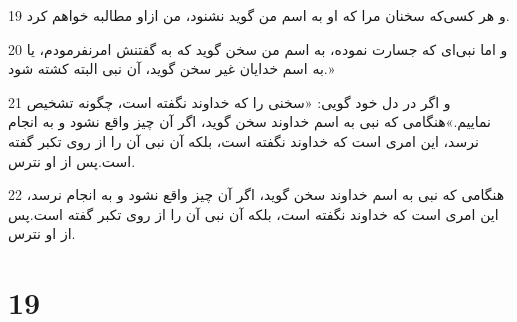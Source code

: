 \par 19 و هر کسی‌که سخنان مرا که او به اسم من گوید نشنود، من ازاو مطالبه خواهم کرد.
\par 20 و اما نبی‌ای که جسارت نموده، به اسم من سخن گوید که به گفتنش امرنفرمودم، یا به اسم خدایان غیر سخن گوید، آن نبی البته کشته شود.»
\par 21 و اگر در دل خود گویی: «سخنی را که خداوند نگفته است، چگونه تشخیص نماییم.»هنگامی که نبی به اسم خداوند سخن گوید، اگر آن چیز واقع نشود و به انجام نرسد، این امری است که خداوند نگفته است، بلکه آن نبی آن را از روی تکبر گفته است.پس از او نترس.
\par 22 هنگامی که نبی به اسم خداوند سخن گوید، اگر آن چیز واقع نشود و به انجام نرسد، این امری است که خداوند نگفته است، بلکه آن نبی آن را از روی تکبر گفته است.پس از او نترس.
 
\chapter{19}

